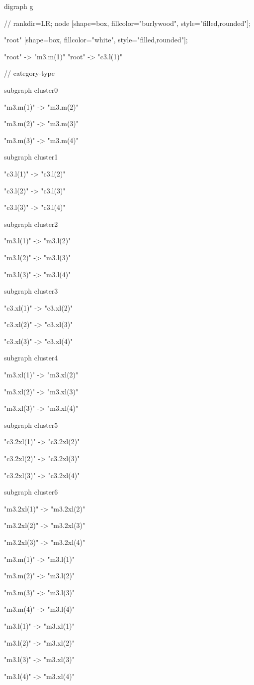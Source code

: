 digraph g{
  // rankdir=LR;
  node [shape=box, fillcolor="burlywood", style="filled,rounded"];

  "root" [shape=box, fillcolor="white", style="filled,rounded"];
  
  "root" -> "m3.m(1)"
  "root" -> "c3.l(1)"
  
   
  // category-type
  
  subgraph cluster0 {
    "m3.m(1)" -> "m3.m(2)"

    "m3.m(2)" -> "m3.m(3)"

    "m3.m(3)" -> "m3.m(4)"
  }

  subgraph cluster1 {
     "c3.l(1)" -> "c3.l(2)"

    "c3.l(2)" -> "c3.l(3)"

    "c3.l(3)" -> "c3.l(4)"
  }

  subgraph cluster2 {
    "m3.l(1)" -> "m3.l(2)"

    "m3.l(2)" -> "m3.l(3)"

    "m3.l(3)" -> "m3.l(4)"
  }
  
  subgraph cluster3 {
    "c3.xl(1)" -> "c3.xl(2)"

    "c3.xl(2)" -> "c3.xl(3)"

    "c3.xl(3)" -> "c3.xl(4)"

  }
  
  subgraph cluster4 {
    "m3.xl(1)" -> "m3.xl(2)"

    "m3.xl(2)" -> "m3.xl(3)"

    "m3.xl(3)" -> "m3.xl(4)"
  }
  
  subgraph cluster5 {
    "c3.2xl(1)" -> "c3.2xl(2)"

    "c3.2xl(2)" -> "c3.2xl(3)"

    "c3.2xl(3)" -> "c3.2xl(4)"
  }  

  subgraph cluster6 {
    "m3.2xl(1)" -> "m3.2xl(2)"

    "m3.2xl(2)" -> "m3.2xl(3)"

    "m3.2xl(3)" -> "m3.2xl(4)"
  }

  "m3.m(1)" -> "m3.l(1)" 
  
  "m3.m(2)" -> "m3.l(2)"
  
  "m3.m(3)" -> "m3.l(3)"
  
  "m3.m(4)" -> "m3.l(4)"   

  "m3.l(1)" -> "m3.xl(1)" 
  
  "m3.l(2)" -> "m3.xl(2)"
  
  "m3.l(3)" -> "m3.xl(3)"
  
  "m3.l(4)" -> "m3.xl(4)"  

}
